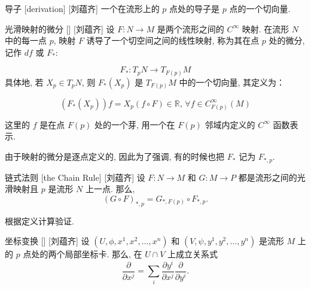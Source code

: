 \documentclass[UTF8]{ctexart}
\begin{document}
        \begin{dfn}
            []
            {导子}
            [derivation]
            [刘蕴齐]
            一个在流形上的 \(p\) 点处的导子是 \(p\) 点的一个切向量. 
        \end{dfn}
        
        \begin{dfn}
            []
            {光滑映射的微分}
            []
            [刘蕴齐]
            设 \( F: N \to M \) 是两个流形之间的 \( C^{\infty} \) 映射. 在流形 \( N \) 中的每一点 \( p \), 映射 \( F \) 诱导了一个切空间之间的线性映射, 称为其在点 \( p \) 处的微分, 记作 \( df \) 或 \( F_* \):
            
            \[
                F_*: T_p N \to T_{F(p)} M
            \]
            具体地, 若 \( X_p \in T_p N \), 则 \( F_{*}(X_p) \) 是 \( T_{F(p)} M \) 中的一个切向量, 其定义为：
            
            \[
                (F_*(X_p)) f = X_p(f \circ F) \in \mathbb{R}, \, \forall f \in C^{\infty}_{F(p)}(M)
            \]
            
            这里的 \( f \) 是在点 \( F(p) \) 处的一个芽, 用一个在 \( F(p) \) 邻域内定义的 \( C^{\infty} \) 函数表示. 
        \end{dfn}

        \begin{rmk}
            []
            由于映射的微分是逐点定义的, 因此为了强调, 有的时候也把 \(F_{*}\) 记为 \(F_{*,p}\). 
        \end{rmk}

        \begin{ppt}
            []
            {链式法则}
            [the Chain Rule]
            [刘蕴齐]
            设 \( F: N \to M \) 和 \( G: M \to P \) 都是流形之间的光滑映射且 \(p\) 是流形 \(N\) 上一点. 那么,
            \[
                {(G \circ F)}_{*,p} = G_{*,F(p)} \circ F_{*,p}.
            \]
        \end{ppt}

        \begin{prf}
            根据定义计算验证.   
        \end{prf}

        \begin{ppt}
            []
            {坐标变换}
            []
            [刘蕴齐]
            设 \((U, \phi, x^1, x^2, \dots, x^n)\) 和 \((V, \psi, y^1, y^2, \dots, y^n)\) 是流形 \(M\) 上的 \(p\) 点处的两个局部坐标卡. 那么, 在 \(U \cap V\) 上成立关系式
            \[
                \frac{\partial}{\partial x^j} = \sum_{i}\frac{\partial y^i}{\partial x^j}\frac{\partial}{\partial y^i}.
            \]
        \end{ppt}
\end{document}
